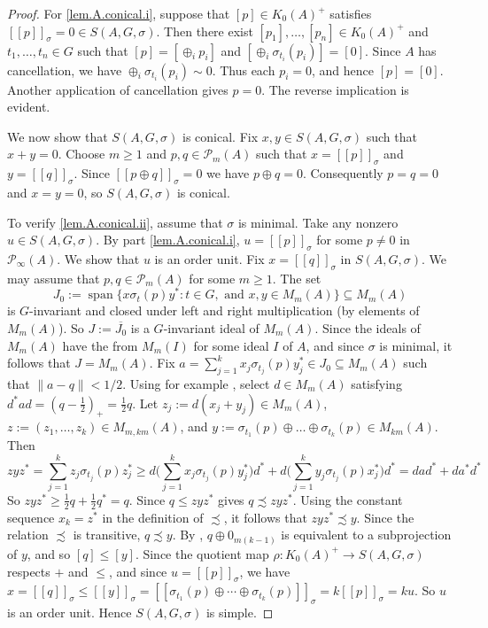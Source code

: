 \documentclass[a4paper, 12pt]{amsart}
\numberwithin{equation}{section}
\theoremstyle{remark}
\theoremstyle{definition}
\begin{document}
\begin{proof}
For \eqref{lem.A.conical.i}, suppose that $[p] \in K_0(A)^+$ satisfies $[[p]]_\sigma = 0 \in S(A,G,\sigma)$.
Then there exist $[p_1],\dots,[p_n]\in K_0(A)^+$ and $t_1,\dots,t_n\in G$ such that $[p]
= [\oplus_ip_i]$ and $[\oplus_i\sigma_{t_i}(p_i)] = [0]$. Since $A$ has cancellation, we
have $\oplus_i\sigma_{t_i}(p_i)\sim 0$. Thus each $p_i=0$, and hence $[p]=[0]$. Another
application of cancellation gives $p=0$. The reverse implication is evident.

We now show that $S(A,G,\sigma)$ is conical. Fix $x,y\in S(A,G,\sigma)$ such that
$x+y=0$. Choose $m\geq 1$ and $p,q\in {\mathcal{P}}_m(A)$ such that $x=[[p]]_\sigma$ and
$y=[[q]]_\sigma$. Since $[[p\oplus q]]_\sigma=0$ we have $p\oplus q=0$. Consequently
$p=q=0$ and $x=y=0$, so $S(A,G,\sigma)$ is conical.

To verify \eqref{lem.A.conical.ii}, assume that $\sigma$ is minimal. Take any nonzero $u\in S(A,G,\sigma)$.
By part \eqref{lem.A.conical.i}, $u=[[p]]_\sigma$ for some $p\neq 0$ in ${\mathcal{P}}_\infty(A)$. We show that $u$ is
an order unit. Fix $x=[[q]]_\sigma$ in $S(A,G,\sigma)$. We may assume that $p,q\in
{\mathcal{P}}_m(A)$ for some $m\geq 1$. The set
$$J_0:={\operatorname{span}}\{x\sigma_{t}(p)y^*: t\in G, \textrm{ and }x,y\in M_m(A)\}\subseteq M_m(A)$$
is $G$-invariant and closed under left and right multiplication (by elements of
$M_m(A)$). So $J:=\overline{J_0}$ is a $G$-invariant ideal of $M_m(A)$. Since the ideals
of $M_m(A)$ have the from $M_m(I)$ for some ideal $I$ of $A$, and since $\sigma$ is
minimal, it follows that $J=M_m(A)$. Fix $a=\sum_{j=1}^k x_j\sigma_{t_j}(p)y_j^*\in
J_0\subseteq M_m(A)$ such that $\|a-q\|<1/2$. Using for example
\cite[Lemma~2.2]{MR1906257}, select $d\in M_m(A)$ satisfying
$d^*ad=(q-\frac{1}{2})_+=\frac{1}{2}q$. Let $z_j:=d(x_j+y_j)\in M_m(A)$,
$z:=(z_1,\dots,z_k)\in M_{m,km}(A)$, and $y:=\sigma_{t_1}(p)\oplus \dots \oplus
\sigma_{t_k}(p)\in M_{km}(A)$. Then \[
zyz^*
    =\sum_{j=1}^k z_j\sigma_{t_j}(p)z_j^*
    \geq d\Big(\sum_{j=1}^k x_j\sigma_{t_j}(p)y_j^*\Big)d^*
        + d\Big(\sum_{j=1}^k y_j\sigma_{t_j}(p)x_j^*\Big)d^*
        = dad^* + da^*d^*
\]
So $zyz^* \geq \frac12q + \frac12q^* = q$. Since $q\leq zyz^*$ \cite[Lemma~2.3]{MR1172023} gives $q\precsim zyz^*$. Using the constant sequence $x_k=z^*$ in the definition of $\precsim$, it follows that
$zyz^*\precsim y$. Since the relation $\precsim$ is transitive, $q\precsim y$. By
\cite[p.~639]{MR1759891}, $q\oplus 0_{m(k-1)}$ is equivalent to a subprojection of $y$,
and so $[q]\leq [y]$. Since the quotient map $\rho\colon K_0(A)^+\to S(A,G,\sigma)$
respects $+$ and $\leq$, and since $u=[[p]]_\sigma$, we have $x=[[q]]_\sigma\leq
[[y]]_\sigma=[[\sigma_{t_1}(p)\oplus\cdots\oplus
\sigma_{t_k}(p)]]_\sigma=k[[p]]_\sigma=ku$. So $u$ is an order unit. Hence $S(A,G,\sigma)$ is simple.


\end{proof}
\end{document}
